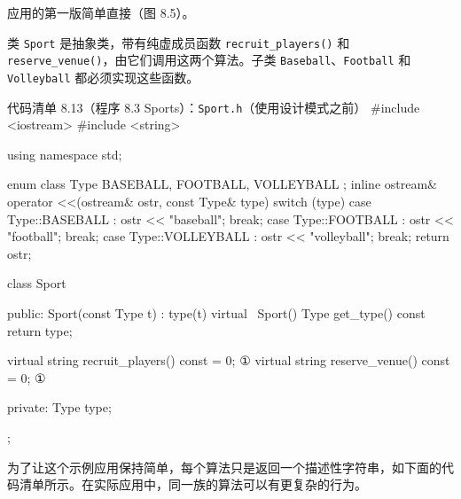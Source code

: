 应用的第一版简单直接（图 8.5）。


类 \texttt{Sport} 是抽象类，带有纯虚成员函数 \texttt{recruit\_\allowbreak{}players(\allowbreak{})\allowbreak{}} 和 \texttt{reserve\_\allowbreak{}venue(\allowbreak{})\allowbreak{}}，由它们调用这两个算法。子类 \texttt{Baseball}、\texttt{Football} 和 \texttt{Volleyball} 都必须实现这些函数。

\begin{codeboxt}{代码清单 8.13（程序 8.3 Sports）：\texttt{Sport.h}（使用设计模式之前）}
#include <iostream>
#include <string>

using namespace std; 

enum class Type { BASEBALL, FOOTBALL, VOLLEYBALL };
inline ostream& operator <<(ostream& ostr, const Type& type)
{
    switch (type)
    {
        case Type::BASEBALL   : ostr << "baseball";   break;
        case Type::FOOTBALL   : ostr << "football";   break;
        case Type::VOLLEYBALL : ostr << "volleyball"; break;
    }
    return ostr;
}

class Sport
{
public:
    Sport(const Type t) : type(t) {}
    virtual ~Sport() {}
    Type get_type() const { return type; }

    virtual string recruit_players() const = 0;      ①
    virtual string reserve_venue()   const = 0;      ①

private:
    Type type;
};
\end{codeboxt}
\par

为了让这个示例应用保持简单，每个算法只是返回一个描述性字符串，如下面的代码清单所示。在实际应用中，同一族的算法可以有更复杂的行为。

